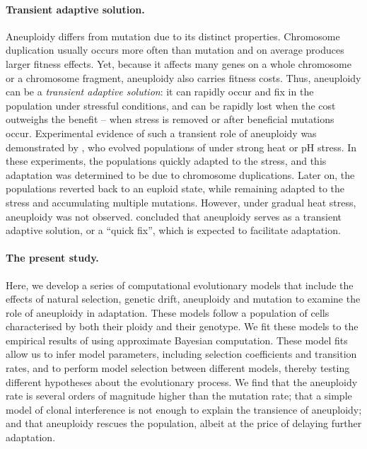 \documentclass[12pt]{extarticle}
\begin{document}
\paragraph*{Transient adaptive solution.} 
Aneuploidy differs from mutation due to its distinct properties. 
Chromosome duplication usually occurs more often than mutation and on average produces larger fitness effects.
Yet, because it affects many genes on a whole chromosome or a chromosome fragment, aneuploidy also carries fitness costs.
Thus, aneuploidy can be a \emph{transient adaptive solution}: it can rapidly occur and fix in the population under stressful conditions, and can be rapidly lost when the cost outweighs the benefit -- when stress is removed or after beneficial mutations occur.
Experimental evidence of such a transient role of aneuploidy was demonstrated by \citet{Yona2012}, who evolved populations of \yeast under strong heat or pH stress.
In these experiments, the populations quickly adapted to the stress, and this adaptation was determined to be due to chromosome duplications.
Later on, the populations reverted back to an euploid state, while remaining adapted to the stress and accumulating multiple mutations.
However, under gradual heat stress, aneuploidy was not observed.
\citet{Yona2012} concluded that aneuploidy serves as a transient adaptive solution, or a ``quick fix'', which is expected to facilitate adaptation. 

\paragraph*{The present study.}
Here, we develop a series of computational evolutionary models that include the effects of natural selection, genetic drift, aneuploidy and mutation to examine the role of aneuploidy in adaptation.
These models follow a population of cells characterised by both their ploidy and their genotype.
We fit these models to the empirical results of \citet{Yona2012} using approximate Bayesian computation.
These model fits allow us to infer model parameters, including selection coefficients and transition rates, and to perform model selection between different models, thereby testing different hypotheses about the evolutionary process.
We find that %
the aneuploidy rate is several orders of magnitude higher than the mutation rate; that a simple model of clonal interference is not enough to explain the transience of aneuploidy; and that aneuploidy rescues the population, albeit at the price of delaying further adaptation.
\end{document}
